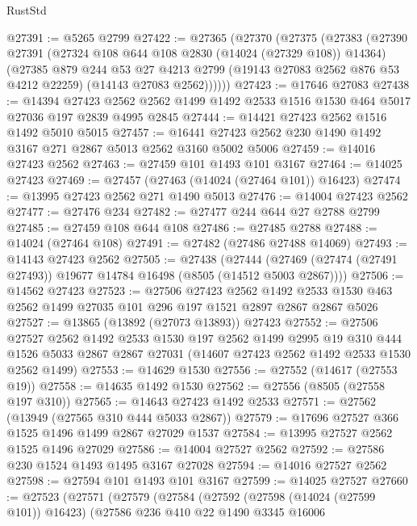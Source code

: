 \begin{lexlean}{RustStd}
\begin{coremodule}
@27391 := @5265 @2799
@27422 := @27365
    (@27370
      (@27375
        (@27383
          (@27390
            @27391
            (@27324 @108 @644 @108 @2830 (@14024 (@27329 @108)) @14364)
            (@27385
              @879
              @244
              @53
              @27
              @4213
              @2799
              (@19143 @27083 @2562 @876 @53 @4212 @22259)
              (@14143 @27083 @2562))))))
@27423 := @17646 @27083
@27438 := @14394
    @27423
    @2562
    @2562
    @1499
    @1492
    @2533
    @1516
    @1530
    @464
    @5017
    @27036
    @197
    @2839
    @4995
    @2845
@27444 := @14421 @27423 @2562 @1516 @1492 @5010 @5015
@27457 := @16441 @27423 @2562 @230 @1490 @1492 @3167 @271 @2867 @5013 @2562 @3160 @5002 @5006
@27459 := @14016 @27423 @2562
@27463 := @27459 @101 @1493 @101 @3167
@27464 := @14025 @27423
@27469 := @27457 (@27463 (@14024 (@27464 @101)) @16423)
@27474 := @13995 @27423 @2562 @271 @1490 @5013
@27476 := @14004 @27423 @2562
@27477 := @27476 @234
@27482 := @27477 @244 @644 @27 @2788 @2799
@27485 := @27459 @108 @644 @108
@27486 := @27485 @2788
@27488 := @14024 (@27464 @108)
@27491 := @27482 (@27486 @27488 @14069)
@27493 := @14143 @27423 @2562
@27505 := @27438
    (@27444 (@27469 (@27474 (@27491 @27493)) @19677 @14784 @16498 (@8505 (@14512 @5003 @2867))))
@27506 := @14562 @27423
@27523 := @27506
    @27423
    @2562
    @1492
    @2533
    @1530
    @463
    @2562
    @1499
    @27035
    @101
    @296
    @197
    @1521
    @2897
    @2867
    @2867
    @5026
@27527 := @13865 (@13892 (@27073 @13893)) @27423
@27552 := @27506
    @27527
    @2562
    @1492
    @2533
    @1530
    @197
    @2562
    @1499
    @2995
    @19
    @310
    @444
    @1526
    @5033
    @2867
    @2867
    @27031
    (@14607 @27423 @2562 @1492 @2533 @1530 @2562 @1499)
@27553 := @14629 @1530
@27556 := @27552 (@14617 (@27553 @19))
@27558 := @14635 @1492 @1530
@27562 := @27556 (@8505 (@27558 @197 @310))
@27565 := @14643 @27423 @1492 @2533
@27571 := @27562 (@13949 (@27565 @310 @444 @5033 @2867))
@27579 := @17696 @27527 @366 @1525 @1496 @1499 @2867 @27029 @1537
@27584 := @13995 @27527 @2562 @1525 @1496 @27029
@27586 := @14004 @27527 @2562
@27592 := @27586 @230 @1524 @1493 @1495 @3167 @27028
@27594 := @14016 @27527 @2562
@27598 := @27594 @101 @1493 @101 @3167
@27599 := @14025 @27527
@27660 := @27523
    (@27571
      (@27579
        (@27584
          (@27592
            (@27598 (@14024 (@27599 @101)) @16423)
            (@27586
              @236
              @410
              @22
              @1490
              @3345
              @16006

\end{coremodule}
\end{lexlean}
